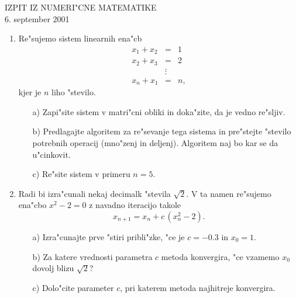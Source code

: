 
\begin{center}
  IZPIT IZ NUMERI"CNE MATEMATIKE\\
  6. september 2001
\end{center}

\vspace{1.5cm}
\begin{enumerate}
 \item Re"sujemo sistem linearnih ena"cb
    \begin{eqnarray*}
      x_1+x_2 &=& 1\\
      x_2+x_3 &=& 2\\
              &\vdots&\\
      x_n+x_1 &=& n,
    \end{eqnarray*}
    kjer je $n$ liho "stevilo.
 \begin{itemize}
    \item[a)] Zapi"site sistem v matri"cni obliki in doka"zite,
      da je vedno re"sljiv.
    \item[b)] Predlagajte algoritem za re"sevanje tega sistema in
      pre"stejte "stevilo potrebnih operacij (mno"zenj in deljenj).
      Algoritem naj bo kar se da u"cinkovit.
    \item[c)] Re"site sistem v primeru $n=5$.
 \end{itemize}

 \item Radi bi izra"cunali nekaj decimalk "stevila 
        $\sqrt{2}$. V ta namen re"sujemo ena"cbo $x^2-2=0$
        z navadno iteracijo takole
        $$x_{n+1}=x_n+c\,(x_n^2-2).$$
 \begin{itemize}
      \item[a)] Izra"cunajte prve "stiri pribli"zke, "ce je
        $c=-0.3$ in $x_0=1$.
      \item[b)] Za katere vrednosti parametra $c$ metoda 
        konvergira, "ce vzamemo $x_0$ dovolj blizu $\sqrt{2}$?
      \item[c)] Dolo"cite parameter $c$, pri katerem metoda 
        najhitreje konvergira.
 \end{itemize}
\end{enumerate}

         
